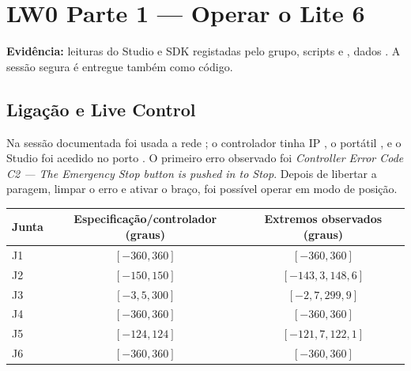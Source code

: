 \clearpage
\section{LW0 Parte 1 — Operar o Lite 6}
\textbf{Evidência:} leituras do Studio e SDK registadas pelo grupo, scripts  e , dados . A sessão segura é entregue também como código.

\subsection{Ligação e Live Control}
Na sessão documentada foi usada a rede ; o controlador tinha IP , o portátil , e o Studio foi acedido no porto . O primeiro erro observado foi \emph{Controller Error Code C2 — The Emergency Stop button is pushed in to Stop}. Depois de libertar a paragem, limpar o erro e ativar o braço, foi possível operar em modo de posição.

\begin{center}\small
\begin{tabular}{@{}lcc@{}}\toprule
Junta & Especificação/controlador (graus) & Extremos observados (graus)\\\midrule
J1 & $[-360,360]$ & $[-360,360]$\\
J2 & $[-150,150]$ & $[-143{,}3,148{,}6]$\\
J3 & $[-3{,}5,300]$ & $[-2{,}7,299{,}9]$\\
J4 & $[-360,360]$ & $[-360,360]$\\
J5 & $[-124,124]$ & $[-121{,}7,122{,}1]$\\
J6 & $[-360,360]$ & $[-360,360]$\\\bottomrule
\end{tabular}
\end{center}

